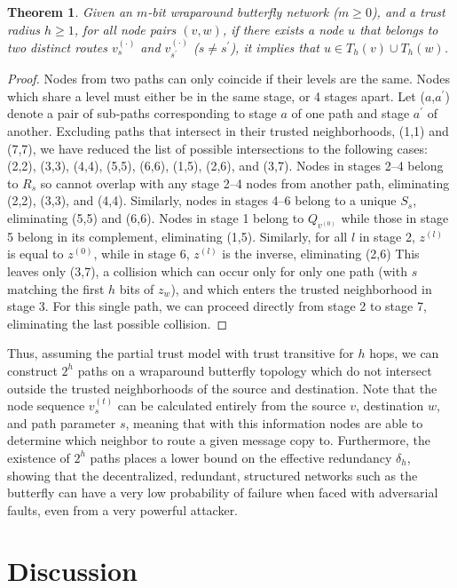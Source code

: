 \documentclass{sig-alternate-05-2015}
\newtheorem{theorem}{Theorem}
\begin{document}
\begin{theorem}
Given an $m$-bit wraparound butterfly network ($m \geq 0$),
and a trust radius $h \geq 1$,
for all node pairs $(v, w)$,
if there exists a node $u$ that belongs to
two distinct routes $v^{(\cdot)}_s$ and $v^{(\cdot)}_{s^\prime}$
($s \neq s^\prime$),
it implies that $u \in T_h(v) \cup T_h(w)$.
\end{theorem}
\begin{proof}
Nodes from two paths can only coincide if their levels are the same.
Nodes which share a level must either be in the same stage, or 4 stages
apart.
Let ($a$,$a^\prime$) denote a pair of sub-paths corresponding to stage $a$ of
one path and stage $a^\prime$ of another.
Excluding paths that intersect in their trusted neighborhoods, (1,1) and (7,7),
we have reduced the list of possible intersections to the following cases:
(2,2), (3,3), (4,4), (5,5), (6,6), (1,5), (2,6), and (3,7).
Nodes in stages 2--4 belong to $R_s$ so cannot overlap with any stage 2--4
nodes from another path, eliminating (2,2), (3,3), and (4,4).
Similarly, nodes in stages 4--6 belong to a unique $S_s$,
eliminating (5,5) and (6,6).
Nodes in stage 1 belong to $Q_{v^{(0)}}$ while those in stage 5 belong in
its complement, eliminating (1,5).
Similarly, for all $l$ in stage 2, $z^{(l)}$ is equal to $z^{(0)}$,
while in stage 6, $z^{(l)}$ is the inverse, eliminating (2,6)
This leaves only (3,7), a collision which can occur only for only one path
(with $s$ matching the first $h$ bits of $z_w$), and which enters the trusted
neighborhood in stage 3.
For this single path, we can proceed directly from stage 2 to stage 7,
eliminating the last possible collision.
\end{proof}

Thus, assuming the partial trust model with trust transitive
for $h$ hops, we can construct $2^h$ paths on a wraparound butterfly topology
which do not intersect outside the trusted neighborhoods of the source and
destination.
Note that the node sequence $v_s^{(t)}$ can be calculated entirely
from the source $v$, destination $w$, and path parameter $s$,
meaning that with this information nodes are able to determine which neighbor
to route a given message copy to.
Furthermore, the existence of $2^h$ paths places a lower bound on the
effective redundancy $\delta_h$,
showing that the decentralized, redundant, structured networks such as the
butterfly can have a very low probability of failure when faced with
adversarial faults, even from a very powerful attacker.

\section{Discussion}
\label{sec-discussion}
\end{document}

